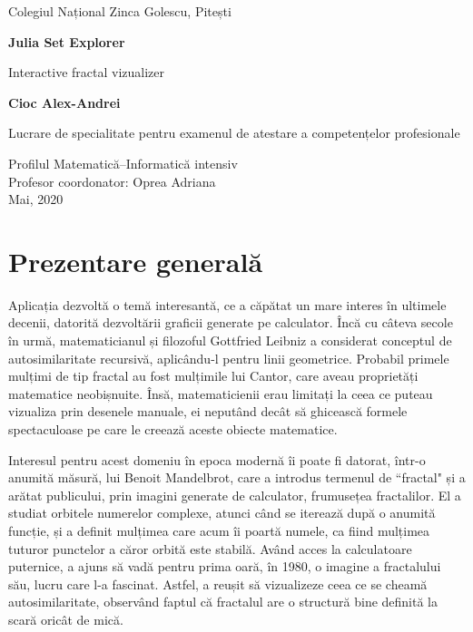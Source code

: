 \documentclass[12pt]{report}
\begin{document}
\begin{titlepage}
	\begin{center}
		\Large
		Colegiul Național Zinca Golescu, Pitești\\
		\vspace*{2cm}

		\Huge
		\textbf{Julia Set Explorer}

		\vspace{0.5cm}
		\LARGE
		Interactive fractal vizualizer

		\vspace{1.5cm}

		\textbf{Cioc Alex-Andrei}

		\vfill

		Lucrare de specialitate pentru examenul de atestare a competențelor profesionale

		\vspace{1.8cm}
		\Large
		Profilul Matematică--Informatică intensiv\\
		Profesor coordonator: Oprea Adriana\\
		Mai, 2020

	\end{center}
\end{titlepage}


\renewcommand*\contentsname{Cuprins}
\tableofcontents

\chapter{Prezentare generală}
Aplicația dezvoltă o temă interesantă, ce a căpătat un mare interes în ultimele decenii,
datorită dezvoltării graficii generate pe calculator. Încă cu câteva secole în urmă, matematicianul și filozoful
Gottfried Leibniz a considerat conceptul de autosimilaritate recursivă, aplicându-l pentru linii geometrice.
Probabil primele mulțimi de tip fractal au fost mulțimile lui Cantor, care aveau proprietăți matematice neobișnuite.
Însă, matematicienii erau limitați la ceea ce puteau vizualiza prin desenele manuale, ei neputând decât să ghicească formele spectaculoase pe care le creează aceste obiecte matematice.

Interesul pentru acest domeniu în epoca modernă îi poate fi datorat, într-o anumită măsură, lui Benoit Mandelbrot,
care a introdus termenul de ``fractal" și a arătat publicului, prin imagini generate de calculator,
frumusețea fractalilor. El a studiat orbitele numerelor complexe, atunci când se iterează după o anumită funcție, și
a definit mulțimea care acum îi poartă numele, ca fiind mulțimea tuturor punctelor a căror orbită este stabilă.
Având acces la calculatoare puternice, a ajuns să vadă pentru prima oară, în 1980, o imagine a fractalului său, lucru care l-a fascinat.
Astfel, a reușit să vizualizeze ceea ce se cheamă autosimilaritate, observând faptul că fractalul are o structură bine definită la scară oricât de mică.
\end{document}
